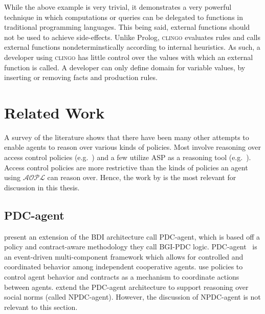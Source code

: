 While the above example is very trivial, it demonstrates a very powerful technique in which computations or queries can be delegated to functions in traditional programming languages.
This being said, external functions should not be used to achieve side-effects.
Unlike Prolog, \textsc{clingo} evaluates rules and calls external functions nondeterminstically according to internal heuristics.
As such, a developer using \textsc{clingo} has little control over the values with which an external function is called.
A developer can only define domain for variable values, by inserting or removing facts and production rules.

\section{Related Work}

A survey of the literature shows that there have been many other attempts to enable agents to reason over various kinds of policies.
Most involve reasoning over access control policies (e.g.~\citet{ferraiolo_role-based_1995,alves_graph-based_2017,barker_logical_2012,sabri_temporal_2016}) and a few utilize ASP as a reasoning tool (e.g.~\citet{barker_reasoning_2014,barker_logical_2012}).
Access control policies are more restrictive than the kinds of policies an agent using $\mathcal{AOPL}$ can reason over.
Hence, the work by \citet{liao_extended_2006} is the most relevant for discussion in this thesis.

\subsection{PDC-agent}

\citet{liao_extended_2006} present an extension of the BDI architecture call PDC-agent, which is based off a policy and contract-aware methodology they call BGI-PDC logic\footnotemark.
PDC-agent~\citep{liao_extended_2006} is an event-driven multi-component framework which allows for controlled and coordinated behavior among independent cooperative agents.
\citet{liao_model_2005} use policies to control agent behavior and contracts as a mechanism to coordinate actions between agents.
\citet{peng_extended_2008} extend the PDC-agent architecture to support reasoning over social norms (called NPDC-agent).
However, the discussion of NPDC-agent is not relevant to this section.


